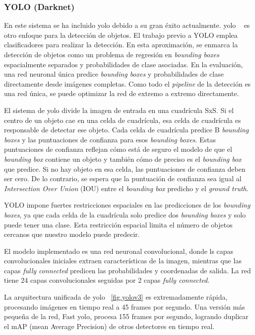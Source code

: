 \subsubsection{YOLO (Darknet)}

En este sistema se ha incluido \acrfull{yolo} debido a su gran éxito actualmente. \acrshort{yolo} ~\cite{yolo_article1} es otro enfoque para la detección de objetos. El trabajo previo a YOLO emplea clasificadores para realizar la detección. En esta aproximación, se enmarca la detección de objetos como un problema de regresión en \textit{bounding boxes} espacialmente separados y probabilidades de clase asociadas. En la evaluación, una red neuronal única predice \textit{bounding boxes} y probabilidades de clase directamente desde imágenes completas. Como todo el \textit{pipeline} de la detección es una red única, se puede optimizar la red de extremo a extremo directamente.

El sistema de \acrshort{yolo} divide la imagen de entrada en una cuadrícula SxS. Si el centro de un objeto cae en una celda de cuadrícula, esa celda de cuadrícula es responsable de detectar ese objeto. Cada celda de cuadrícula predice B \textit{bounding boxes} y las puntuaciones de confianza para esos \textit{bounding boxes}. Estas puntuaciones de confianza reflejan cómo está de seguro el modelo de que el \textit{bounding box} contiene un objeto y también cómo de preciso es el \textit{bounding box} que predice. Si no hay objeto en esa celda, las puntuaciones de confianza deben ser cero. De lo contrario, se espera que la puntuación de confianza sea igual al \textit{Intersection Over Union} (IOU) entre el \textit{bounding box} predicho y el \textit{ground truth}.

YOLO impone fuertes restricciones espaciales en las predicciones de los \textit{bounding boxes}, ya que cada celda de la cuadrícula solo predice dos \textit{bounding boxes} y solo puede tener una clase. Esta restricción espacial limita el número de objetos cercanos que nuestro modelo puede predecir. 

El modelo implementado es una red neuronal convolucional, donde ls capas convolucionales iniciales extraen características de la imagen, mientras que las capas \textit{fully connected} predicen las probabilidades y coordenadas de salida. La red tiene 24 capas convolucionales seguidas por 2 capas \textit{fully connected}. 

La arquitectura unificada de \acrshort{yolo} ~\ref{fig.yolov3} es extremadamente rápida, procesando imágenes en tiempo real a 45 frames por segundo. Una versión más pequeña de la red, Fast \acrshort{yolo}, procesa 155 frames por segundo, logrando duplicar el mAP (mean Average Precision) de otros detectores en tiempo real.

